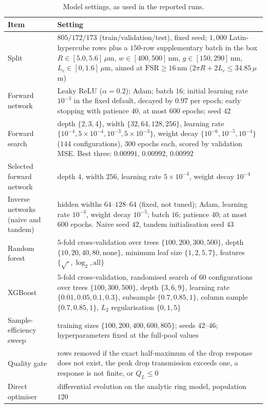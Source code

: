 \documentclass[11pt]{article}
\newcommand{\QL}{Q_L}
\begin{document}
\begin{table}[h]
\centering
\caption{Model settings, as used in the reported runs.}
\small
\begin{tabular}{@{}p{3.1cm}p{11.4cm}@{}}
\toprule
Item & Setting \\
\midrule
Split & $805/172/173$ (train/validation/test), fixed seed; $1{,}000$ Latin-hypercube rows plus a $150$-row supplementary batch in the box $R \in [5.0, 5.6]\,\mu$m, $w \in [400, 500]$\,nm, $g \in [150, 290]$\,nm, $L_c \in [0, 1.6]\,\mu$m, aimed at $\mathrm{FSR} \ge 16$\,nm ($2\pi R + 2L_c \le 34.85\,\mu$m) \\
Forward network & Leaky ReLU ($\alpha = 0.2$); Adam; batch $16$; initial learning rate $10^{-3}$ in the fixed default, decayed by $0.97$ per epoch; early stopping with patience $40$, at most $600$ epochs; seed $42$ \\
Forward search & depth $\{2,3,4\}$, width $\{32,64,128,256\}$, learning rate $\{10^{-4}, 5\times10^{-4}, 10^{-3}, 5\times10^{-3}\}$, weight decay $\{10^{-6}, 10^{-5}, 10^{-4}\}$ ($144$ configurations), $300$ epochs each, scored by validation MSE. Best three: $0.00991$, $0.00992$, $0.00992$ \\
Selected forward network & depth $4$, width $256$, learning rate $5\times10^{-3}$, weight decay $10^{-4}$ \\
Inverse networks (naive and tandem) & hidden widths $64$--$128$--$64$ (fixed, not tuned); Adam, learning rate $10^{-3}$, weight decay $10^{-5}$; batch $16$; patience $40$; at most $600$ epochs. Naive seed $42$, tandem initialisation seed $43$ \\
Random forest & $5$-fold cross-validation over trees $\{100,200,300,500\}$, depth $\{10,20,40,80,\text{none}\}$, minimum leaf size $\{1,2,5,7\}$, features $\{\sqrt{\cdot}, \log_2, \text{all}\}$ \\
XGBoost & $5$-fold cross-validation, randomised search of $60$ configurations over trees $\{100,300,500\}$, depth $\{3,6,9\}$, learning rate $\{0.01,0.05,0.1,0.3\}$, subsample $\{0.7,0.85,1\}$, column sample $\{0.7,0.85,1\}$, $L_2$ regularisation $\{0,1,5\}$ \\
Sample-efficiency sweep & training sizes $\{100,200,400,600,805\}$; seeds $42$--$46$; hyperparameters fixed at the full-pool values \\
Quality gate & rows removed if the exact half-maximum of the drop response does not exist, the peak drop transmission exceeds one, a response is not finite, or $\QL \le 0$ \\
Direct optimiser & differential evolution on the analytic ring model, population $120$ \\
\bottomrule
\end{tabular}
\end{table}
\end{document}
